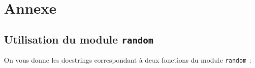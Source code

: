 



\section*{Annexe}

\subsection*{Utilisation du module \texttt{random}}

On vous donne les docstrings correspondant à deux fonctions du module \texttt{random}~: 

